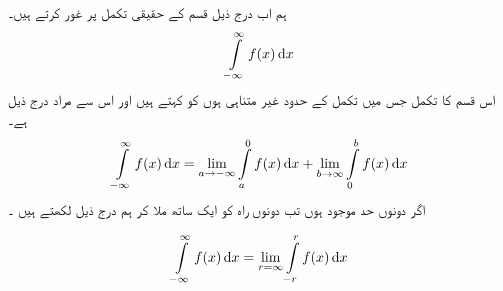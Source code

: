 ہم اب درج ذیل قسم کے حقیقی تکمل پر غور کرتے ہیں۔
\begin{align}\label{مساوات_بقیہ_غیر_مناسب_تکمل_الف}
\int\limits_{-\infty}^{\infty} f(x)\dif x
\end{align} 
اس قسم کا تکمل جس میں تکمل کے حدود غیر متناہی ہوں کو  کہتے ہیں اور اس سے مراد درج ذیل ہے۔
\begin{align}\label{مساوات_بقیہ_غیر_متناہی_تکمل_حد}
\int\limits_{-\infty}^{\infty} f(x)\dif x=\lim_{a\to-\infty}\int\limits_{a}^{0} f(x)\dif x+\lim_{b\to\infty}\int\limits_{0}^{b} f(x)\dif x
\end{align}
اگر دونوں حد موجود ہوں تب دونوں راہ کو ایک ساتھ ملا کر ہم درج ذیل لکھتے ہیں
۔

\begin{align}\label{مساوات_بقیہ_کوشی_صدر_قیمت}
\int\limits_{-\infty}^{\infty}f(x)\dif x=\lim_{r=\infty}\int\limits_{-r}^{r} f(x)\dif x
\end{align} 

